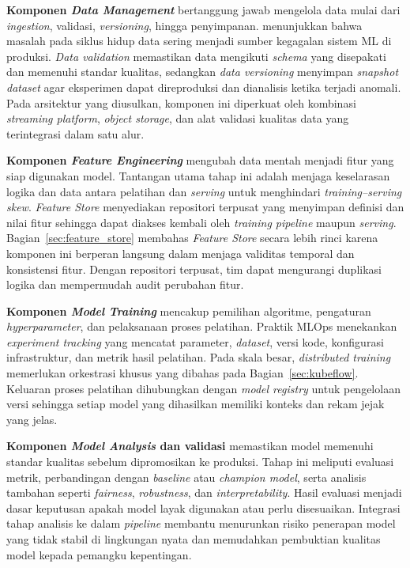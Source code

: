 \textbf{Komponen \textit{Data Management}} bertanggung jawab mengelola data mulai dari \textit{ingestion}, validasi, \textit{versioning}, hingga penyimpanan. \textcite{polyzotis2018data} menunjukkan bahwa masalah pada siklus hidup data sering menjadi sumber kegagalan sistem ML di produksi. \textit{Data validation} memastikan data mengikuti \textit{schema} yang disepakati dan memenuhi standar kualitas, sedangkan \textit{data versioning} menyimpan \textit{snapshot dataset} agar eksperimen dapat direproduksi dan dianalisis ketika terjadi anomali. Pada arsitektur yang diusulkan, komponen ini diperkuat oleh kombinasi \textit{streaming platform}, \textit{object storage}, dan alat validasi kualitas data yang terintegrasi dalam satu alur.

\textbf{Komponen \textit{Feature Engineering}} mengubah data mentah menjadi fitur yang siap digunakan model. Tantangan utama tahap ini adalah menjaga keselarasan logika dan data antara pelatihan dan \textit{serving} untuk menghindari \textit{training--serving skew}. \textit{Feature Store} menyediakan repositori terpusat yang menyimpan definisi dan nilai fitur sehingga dapat diakses kembali oleh \textit{training pipeline} maupun \textit{serving}. Bagian~\ref{sec:feature_store} membahas \textit{Feature Store} secara lebih rinci karena komponen ini berperan langsung dalam menjaga validitas temporal dan konsistensi fitur. Dengan repositori terpusat, tim dapat mengurangi duplikasi logika dan mempermudah audit perubahan fitur.

\textbf{Komponen \textit{Model Training}} mencakup pemilihan algoritme, pengaturan \textit{hyperparameter}, dan pelaksanaan proses pelatihan. Praktik MLOps menekankan \textit{experiment tracking} yang mencatat parameter, \textit{dataset}, versi kode, konfigurasi infrastruktur, dan metrik hasil pelatihan. Pada skala besar, \textit{distributed training} memerlukan orkestrasi khusus yang dibahas pada Bagian~\ref{sec:kubeflow}. Keluaran proses pelatihan dihubungkan dengan \textit{model registry} untuk pengelolaan versi sehingga setiap model yang dihasilkan memiliki konteks dan rekam jejak yang jelas.

\textbf{Komponen \textit{Model Analysis} dan validasi} memastikan model memenuhi standar kualitas sebelum dipromosikan ke produksi. Tahap ini meliputi evaluasi metrik, perbandingan dengan \textit{baseline} atau \textit{champion model}, serta analisis tambahan seperti \textit{fairness}, \textit{robustness}, dan \textit{interpretability}. Hasil evaluasi menjadi dasar keputusan apakah model layak digunakan atau perlu disesuaikan. Integrasi tahap analisis ke dalam \textit{pipeline} membantu menurunkan risiko penerapan model yang tidak stabil di lingkungan nyata dan memudahkan pembuktian kualitas model kepada pemangku kepentingan.

